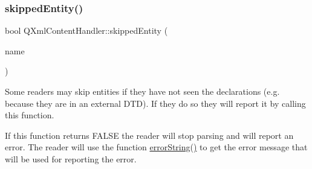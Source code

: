 \mbox{\label{class_q_xml_content_handler_ac3b27d569634c5d7a7fac001a6cc4845}} 
\subsubsection{\texorpdfstring{skippedEntity()}{skippedEntity()}}
{\footnotesize\ttfamily bool Q\+Xml\+Content\+Handler\+::skipped\+Entity (\begin{DoxyParamCaption}\item[{const \mbox{\hyperlink{class_q_string}{Q\+String}} \&}]{name }\end{DoxyParamCaption})\hspace{0.3cm}{\ttfamily [pure virtual]}}

Some readers may skip entities if they have not seen the declarations (e.\+g. because they are in an external D\+TD). If they do so they will report it by calling this function.

If this function returns F\+A\+L\+SE the reader will stop parsing and will report an error. The reader will use the function \mbox{\hyperlink{class_q_xml_content_handler_adba96547bad1cf1b009dbfb7b7c571be}{error\+String()}} to get the error message that will be used for reporting the error. 

